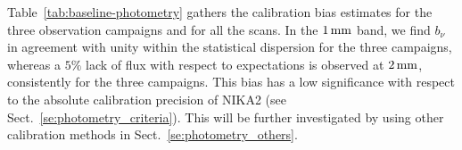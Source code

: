 %
Table~\ref{tab:baseline-photometry} gathers the calibration bias
estimates for the three observation campaigns and for all the scans.
In the $1\,\rm{mm}$ band, we find
$b_\nu$ in agreement with unity within the statistical dispersion for
the three campaigns,
whereas a $5\%$ lack of flux with respect to expectations is observed
at $2\,\rm{mm}$, consistently for the three campaigns. This bias has a
low significance with respect to the absolute calibration precision of
NIKA2 (see Sect.~\ref{se:photometry_criteria}).
This will be further investigated by using other calibration methods
in Sect.~\ref{se:photometry_others}.

